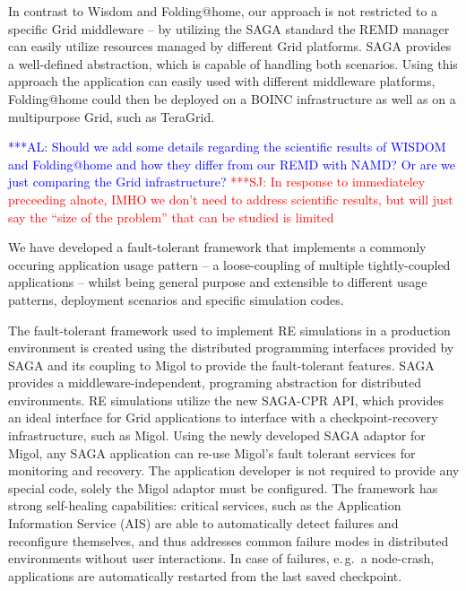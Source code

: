 \documentclass[times, 10pt,twocolumn]{article}
\newcommand{\alnote}[1]{ {\textcolor{blue} { ***AL: #1 }}}
\newcommand{\jhanote}[1]{ {\textcolor{red} { ***SJ: #1 }}}
\newcommand{\alnote}[1]{}
\newcommand{\jhanote}[1]{}
\begin{document}
In contrast to Wisdom and Folding@home, our approach is not restricted
to a specific Grid middleware -- by utilizing the SAGA standard the
REMD manager can easily utilize resources managed by different Grid
platforms. SAGA provides a well-defined abstraction, which is capable
of handling both scenarios. Using this approach the application can
easily used with different middleware platforms, Folding@home could
then be deployed on a BOINC infrastructure as well as on a
multipurpose Grid, such as TeraGrid.

\alnote{Should we add some details regarding the scientific results of
  WISDOM and Folding@home and how they differ from our REMD with NAMD?
  Or are we just comparing the Grid infrastructure?}  \jhanote{In
  response to immediateley preceeding alnote, IMHO we don't need to
  address scientific results, but will just say the ``size of the
  problem'' that can be studied is limited}



% 


We have developed a fault-tolerant framework that implements a
commonly occuring application usage pattern -- a loose-coupling of
multiple tightly-coupled applications -- whilst being general purpose
and extensible to different usage patterns, deployment scenarios and
specific simulation codes.

The fault-tolerant framework used to implement RE simulations in a
production environment is created using the distributed programming
interfaces provided by SAGA and its coupling to Migol to provide the
fault-tolerant features.  SAGA provides a middleware-independent,
programing abstraction for distributed environments. RE simulations
utilize the new SAGA-CPR API, which provides an ideal interface for
Grid applications to interface with a checkpoint-recovery
infrastructure, such as Migol. Using the newly developed SAGA adaptor
for Migol, any SAGA application can re-use Migol's fault tolerant
services for monitoring and recovery.  The application developer is
not required to provide any special code, solely the Migol adaptor
must be configured.  The framework has strong self-healing
capabilities: critical services, such as the Application Information
Service (AIS) are able to automatically detect failures and
reconfigure themselves, and thus addresses common failure modes in
distributed environments without user interactions.
In case of failures, e.\,g.\ a node-crash, applications are
automatically restarted from the last saved
checkpoint. %
\end{document}
